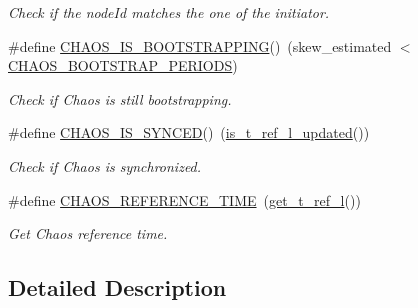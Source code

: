 \begin{DoxyCompactItemize}
\begin{DoxyCompactList}\small\item\em Check if the node\-Id matches the one of the initiator. \end{DoxyCompactList}\item 
\#define \hyperlink{group__chaos-test-defines_gad93c921ab7f327f23c1ba985a0f33c1a}{C\-H\-A\-O\-S\-\_\-\-I\-S\-\_\-\-B\-O\-O\-T\-S\-T\-R\-A\-P\-P\-I\-N\-G}()~(skew\-\_\-estimated $<$ \hyperlink{group__chaos-test-settings_ga115f8d5d589cf7d28c1a67902105c766}{C\-H\-A\-O\-S\-\_\-\-B\-O\-O\-T\-S\-T\-R\-A\-P\-\_\-\-P\-E\-R\-I\-O\-D\-S})
\begin{DoxyCompactList}\small\item\em Check if Chaos is still bootstrapping. \end{DoxyCompactList}\item 
\#define \hyperlink{group__chaos-test-defines_ga8953d1c8a6ef4556adfaf81253f98fc7}{C\-H\-A\-O\-S\-\_\-\-I\-S\-\_\-\-S\-Y\-N\-C\-E\-D}()~(\hyperlink{group__chaos__sync_gae7e475746ec86ae6dd8ca9ece642faf8}{is\-\_\-t\-\_\-ref\-\_\-l\-\_\-updated}())
\begin{DoxyCompactList}\small\item\em Check if Chaos is synchronized. \end{DoxyCompactList}\item 
\#define \hyperlink{group__chaos-test-defines_ga034934dede09c474ca85417c4794cb51}{C\-H\-A\-O\-S\-\_\-\-R\-E\-F\-E\-R\-E\-N\-C\-E\-\_\-\-T\-I\-M\-E}~(\hyperlink{group__chaos__sync_gaa37a5474c90f7747d0f5054dc1a03764}{get\-\_\-t\-\_\-ref\-\_\-l}())
\begin{DoxyCompactList}\small\item\em Get Chaos reference time. \end{DoxyCompactList}\end{DoxyCompactItemize}


\subsection{Detailed Description}


